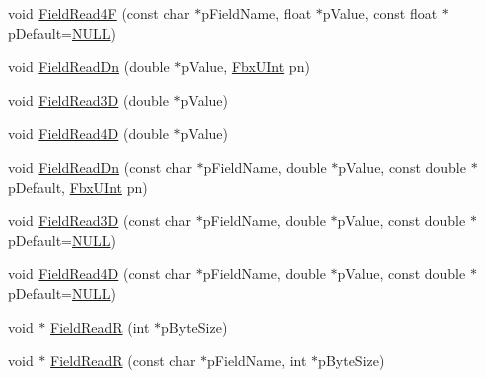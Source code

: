 \begin{Indent}
\begin{DoxyCompactItemize}
\item 
void \hyperlink{class_fbx_i_o_a950a6dc98d1adeae7d61b1621c728fa5}{Field\+Read4F} (const char $\ast$p\+Field\+Name, float $\ast$p\+Value, const float $\ast$p\+Default=\hyperlink{fbxarch_8h_a070d2ce7b6bb7e5c05602aa8c308d0c4}{N\+U\+LL})
\item 
void \hyperlink{class_fbx_i_o_a43480db206d7963bc225a7b0c2d7bec1}{Field\+Read\+Dn} (double $\ast$p\+Value, \hyperlink{fbxtypes_8h_ae9fb141d8158a730aa85ec5ff2ea3f6b}{Fbx\+U\+Int} pn)
\item 
void \hyperlink{class_fbx_i_o_a41258c146be085acabf73c83df05e34b}{Field\+Read3D} (double $\ast$p\+Value)
\item 
void \hyperlink{class_fbx_i_o_af5cdd3b09f40de48243b12aed5d05d0a}{Field\+Read4D} (double $\ast$p\+Value)
\item 
void \hyperlink{class_fbx_i_o_a6f42e7ff07dd2c063765d72882830c36}{Field\+Read\+Dn} (const char $\ast$p\+Field\+Name, double $\ast$p\+Value, const double $\ast$p\+Default, \hyperlink{fbxtypes_8h_ae9fb141d8158a730aa85ec5ff2ea3f6b}{Fbx\+U\+Int} pn)
\item 
void \hyperlink{class_fbx_i_o_af10372aa1d3e251eba4e21800578d94f}{Field\+Read3D} (const char $\ast$p\+Field\+Name, double $\ast$p\+Value, const double $\ast$p\+Default=\hyperlink{fbxarch_8h_a070d2ce7b6bb7e5c05602aa8c308d0c4}{N\+U\+LL})
\item 
void \hyperlink{class_fbx_i_o_a32078c03d828092c5a75ba5b50565c33}{Field\+Read4D} (const char $\ast$p\+Field\+Name, double $\ast$p\+Value, const double $\ast$p\+Default=\hyperlink{fbxarch_8h_a070d2ce7b6bb7e5c05602aa8c308d0c4}{N\+U\+LL})
\item 
void $\ast$ \hyperlink{class_fbx_i_o_a4b88ca35ea607937ed600d4ac930d3bc}{Field\+ReadR} (int $\ast$p\+Byte\+Size)
\item 
void $\ast$ \hyperlink{class_fbx_i_o_a94d795cee82dc69118292b2c864862ad}{Field\+ReadR} (const char $\ast$p\+Field\+Name, int $\ast$p\+Byte\+Size)
\end{DoxyCompactItemize}
\end{Indent}
